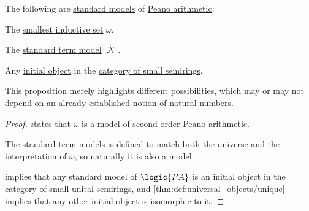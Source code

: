\begin{proposition}\label{thm:peano_arithmetic_standard_models}
  The following are \hyperref[def:peano_arithmetic_standard_model]{standard models} of \hyperref[def:peano_arithmetic]{Peano arithmetic}:
  \begin{itemize}
     The \hyperref[def:smallest_inductive_set]{smallest inductive set} \( \omega \).

     The \hyperref[def:peano_arithmetic_term_model]{standard term model} \( \mscrN \).

     Any \hyperref[def:universal_objects/initial]{initial object} in the \hyperref[def:semiring/category]{category of small semirings}.
  \end{itemize}
\end{proposition}
\begin{comments}
  \item This proposition merely highlights different possibilities, which may or may not depend on an already established notion of natural numbers.
\end{comments}
\begin{proof}
    states that \( \omega \) is a model of second-order Peano arithmetic.

   The standard term models is defined to match both the universe and the interpretation of \( \omega \), so naturally it is also a model.

    implies that any standard model of \( \logic{PA} \) is an initial object in the category of small unital semirings, and \cref{thm:def:universal_objects/unique} implies that any other initial object is isomorphic to it.
\end{proof}

